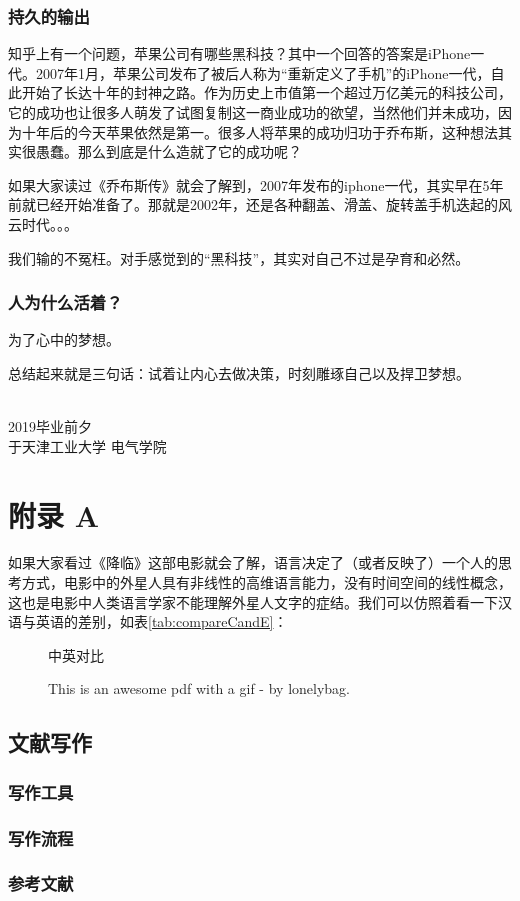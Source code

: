 \documentclass[UTF8]{ctexbook}
\begin{document}
\subsection*{持久的输出}
知乎上有一个问题，苹果公司有哪些黑科技？其中一个回答的答案是iPhone一代。2007年1月，苹果公司发布了被后人称为“重新定义了手机”的iPhone一代，自此开始了长达十年的封神之路。作为历史上市值第一个超过万亿美元的科技公司，它的成功也让很多人萌发了试图复制这一商业成功的欲望，当然他们并未成功，因为十年后的今天苹果依然是第一。很多人将苹果的成功归功于乔布斯，这种想法其实很愚蠢。那么到底是什么造就了它的成功呢？

如果大家读过《乔布斯传》就会了解到，2007年发布的iphone一代，其实早在5年前就已经开始准备了。那就是2002年，还是各种翻盖、滑盖、旋转盖手机迭起的风云时代。。。

我们输的不冤枉。对手感觉到的“黑科技”，其实对自己不过是孕育和必然。

\subsection*{人为什么活着？}
为了心中的梦想。

\vspace{2cm}
总结起来就是三句话：试着让内心去做决策，时刻雕琢自己以及捍卫梦想。

\hspace{4cm}\\
\noindent2019毕业前夕\\
于天津工业大学 \quad 电气学院






\appendix
\chapter{附录 A}\label{fuluA}
如果大家看过《降临》这部电影就会了解，语言决定了（或者反映了）一个人的思考方式，电影中的外星人具有非线性的高维语言能力，没有时间空间的线性概念，这也是电影中人类语言学家不能理解外星人文字的症结。我们可以仿照着看一下汉语与英语的差别，如表\ref{tab:compareCandE}：

\begin{figure}[!htb]
	\renewcommand{\arraystretch}{1.3} %
	\caption{中英对比}\label{tab:compareCandE}
	\centering
	\vspace{-0.3cm}
	\caption{This is an awesome pdf with a gif - by lonelybag.}\label{fig:39}
\end{figure}

\section{文献写作}
\subsection{写作工具}
\subsection{写作流程}
\subsection{参考文献}
\end{document}
